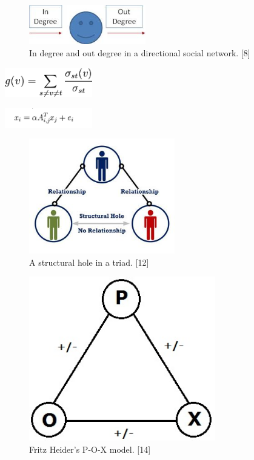 \documentclass[conference,letterpaper]{IEEEtran}
\begin{document}
\begin{center}
\begin{figure}[hb]
\centering
\includegraphics[width=2.0in]{degree_centrality}
\caption{
In degree and out degree in a directional social network. [8]
}
\label{fig_sim}
\end{figure}
\end{center}

\centerline{
  \includegraphics[width=1.5in]{betweenness_centrality.png}
}

\centerline{
  \includegraphics[width=1.5in]{alpha_centrality.png}
}

\begin{center}
\begin{figure}[hb]
\centering
\includegraphics[width=2.5in]{structural_hole}
\caption{
A structural hole in a triad. [12]
}
\label{fig_sim}
\end{figure}
\end{center}

\begin{center}
\begin{figure}[hb]
\centering
\includegraphics[width=3.2in]{pox}
\caption{
Fritz Heider's P-O-X model. [14]
}
\label{fig_sim}
\end{figure}
\end{center}
\end{document}
